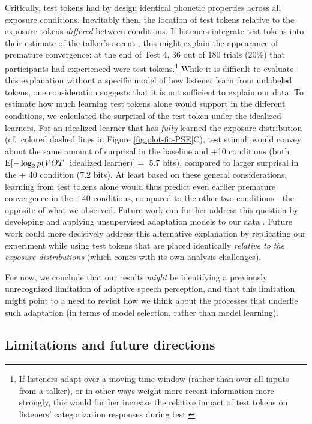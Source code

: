 \documentclass[
  11pt,
  man,mask,floatsintext]{apa6}
\begin{document}
Critically, test tokens had by design identical phonetic properties across all exposure conditions. Inevitably then, the location of test tokens relative to the exposure tokens \emph{differed} between conditions. If listeners integrate test tokens into their estimate of the talker's accent \autocite{xie-kurumada2024}, this might explain the appearance of premature convergence: at the end of Test 4, 36 out of 180 trials (20\%) that participants had experienced were test tokens.\footnote{If listeners adapt over a moving time-window (rather than over all inputs from a talker), or in other ways weight more recent information more strongly, this would further increase the relative impact of test tokens on listeners' categorization responses during test.} While it is difficult to evaluate this explanation without a specific model of how listener learn from unlabeled tokens, one consideration suggests that it is not sufficient to explain our data. To estimate how much learning test tokens alone would support in the different conditions, we calculated the surprisal of the test token under the idealized learners. For an idealized learner that has \emph{fully} learned the exposure distribution (cf.~colored dashed lines in Figure \ref{fig:plot-fit-PSE}C), test stimuli would convey about the same amount of surprisal in the baseline and +10 conditions (both \({\rm E}[-\log_2 p(VOT |\) idealized learner\()] =\) 5.7 bits), compared to larger surprisal in the + 40 condition (7.2 bits). At least based on these general considerations, learning from test tokens alone would thus predict even earlier premature convergence in the +40 conditions, compared to the other two conditions---the opposite of what we observed. Future work can further address this question by developing and applying unsupervised adaptation models to our data \autocites[e.g.,][]{harmon2019,olejarczuk2018,yan-jaeger2018}. Future work could more decisively address this alternative explanation by replicating our experiment while using test tokens that are placed identically \emph{relative to the exposure distributions} (which comes with its own analysis challenges).

For now, we conclude that our results \emph{might} be identifying a previously unrecognized limitation of adaptive speech perception, and that this limitation might point to a need to revisit how we think about the processes that underlie such adaptation (in terms of model selection, rather than model learning).

\subsection{Limitations and future directions}\label{limitations-and-future-directions}
\end{document}
